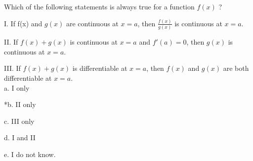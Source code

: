 
Which of the following statements is always true for a function \( f(x) \) ?

I. If f(x) and \( g(x) \) are continuous at \( x=a \), then \(\frac{f(x)}{g(x)}\) is
continuous at \( x=a \).

II. If \( f(x)+g(x) \) is continuous at \( x=a \) and \( f'(a)=0 \), then \( g(x) \) is
continuous at \( x=a \).

III. If \( f(x)+g(x) \) is differentiable at \( x=a \), then \( f(x) \) and \( g(x) \) are both
differentiable at \( x=a \). \\

a. I only

*b. II only

c. III only

d. I and II

e. I do not know.\\
